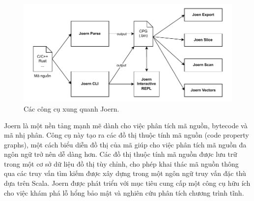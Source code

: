 





\begin{figure}[H]
  \includegraphics[width=1\columnwidth]{figures/c2/c2_joern_tools.drawio.pdf}
  \centering
  \caption{Các công cụ xung quanh Joern.}
  \label{img:c2_joern_tools}
\end{figure}

Joern là một nền tảng mạnh mẽ dành cho việc phân tích mã nguồn, bytecode và mã nhị phân.
Công cụ này tạo ra các đồ thị thuộc tính mã nguồn (code property graphs), một cách biểu diễn đồ thị của mã giúp cho việc phân tích mã nguồn đa ngôn ngữ trở nên dễ dàng hơn.
Các đồ thị thuộc tính mã nguồn được lưu trữ trong một cơ sở dữ liệu đồ thị tùy chỉnh, cho phép khai thác mã nguồn thông qua các truy vấn tìm kiếm được xây dựng trong một ngôn ngữ truy vấn đặc thù dựa trên Scala.
Joern được phát triển với mục tiêu cung cấp một công cụ hữu ích cho việc khám phá lỗ hổng bảo mật và nghiên cứu phân tích chương trình tĩnh.

